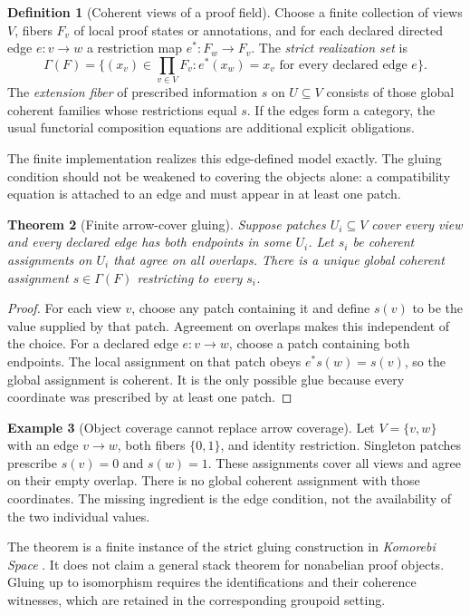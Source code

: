 \documentclass[11pt,oneside]{article}
\newtheorem{theorem}{Theorem}[section]
\theoremstyle{definition}
\newtheorem{definition}[theorem]{Definition}
\newtheorem{example}[theorem]{Example}
\theoremstyle{remark}
\begin{document}
\begin{definition}[Coherent views of a proof field]
Choose a finite collection of views $V$, fibers $F_v$ of local proof states or annotations, and for each declared directed edge $e:v\to w$ a restriction map $e^*:F_w\to F_v$. The \emph{strict realization set} is
\[
\Gamma(F)=\big\{(x_v)\in\prod_{v\in V}F_v : e^*(x_w)=x_v\text{ for every declared edge }e\big\}.
\]
The \emph{extension fiber} of prescribed information $s$ on $U\subseteq V$ consists of those global coherent families whose restrictions equal $s$. If the edges form a category, the usual functorial composition equations are additional explicit obligations.
\end{definition}

The finite implementation  realizes this edge-defined model exactly. The gluing condition should not be weakened to covering the objects alone: a compatibility equation is attached to an edge and must appear in at least one patch.

\begin{theorem}[Finite arrow-cover gluing]
Suppose patches $U_i\subseteq V$ cover every view and every declared edge has both endpoints in some $U_i$. Let $s_i$ be coherent assignments on $U_i$ that agree on all overlaps. There is a unique global coherent assignment $s\in\Gamma(F)$ restricting to every $s_i$.
\end{theorem}
\begin{proof}
For each view $v$, choose any patch containing it and define $s(v)$ to be the value supplied by that patch. Agreement on overlaps makes this independent of the choice. For a declared edge $e:v\to w$, choose a patch containing both endpoints. The local assignment on that patch obeys $e^*s(w)=s(v)$, so the global assignment is coherent. It is the only possible glue because every coordinate was prescribed by at least one patch.
\end{proof}

\begin{example}[Object coverage cannot replace arrow coverage]
Let $V=\{v,w\}$ with an edge $v\to w$, both fibers $\{0,1\}$, and identity restriction. Singleton patches prescribe $s(v)=0$ and $s(w)=1$. These assignments cover all views and agree on their empty overlap. There is no global coherent assignment with those coordinates. The missing ingredient is the edge condition, not the availability of the two individual values.
\end{example}

The theorem is a finite instance of the strict gluing construction in \emph{Komorebi Space} \cite{komorebi-space}. It does not claim a general stack theorem for nonabelian proof objects. Gluing up to isomorphism requires the identifications and their coherence witnesses, which are retained in the corresponding groupoid setting.
\end{document}
